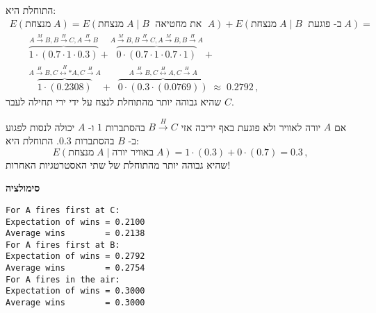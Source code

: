 התוחלת היא:
\vspace*{-4ex}
\[
\renewcommand*{\arraystretch}{2.5}
\begin{array}{l}
E(\textrm{מנצחת}\;A) =E(\textrm{מנצחת}\;A\;|\;B\;\textrm{ את מחטיאה }\;A) + E(\textrm{מנצחת}\;A\;|\;B\;\textrm{ ב- פוגעת}\;A)=\\
\qquad
\overbrace{1\cdot (0.7\cdot 1\cdot 0.3)}%
^{A\stackrel{M}{\longrightarrow}B, B\stackrel{H}{\longrightarrow}C, A\stackrel{H}{\longrightarrow}B}+
\overbrace{0\cdot (0.7\cdot 1\cdot 0.7\cdot 1)}%
^{A\stackrel{M}{\longrightarrow}B, B\stackrel{H}{\longrightarrow}C,A\stackrel{M}{\longrightarrow}B,B\stackrel{H}{\longrightarrow}A} +\\
\qquad
\overbrace{1\cdot (0.2308)}%
^{A\stackrel{H}{\longrightarrow}B, C\stackrel{H}{\longleftrightarrow*}A,C\stackrel{H}{\longrightarrow}A}\!\!\! +\;\;
\overbrace{0\cdot (0.3\cdot (0.0769))}%
^{A\stackrel{H}{\longrightarrow}B, C\stackrel{H}{\longleftrightarrow}A,C\stackrel{H}{\longrightarrow}A}
\;\approx\; 0.2792\,,
\end{array}
\]
שהיא גבוהה יותר מהתוחלת לנצח על ידי ירי תחילה לעבר 
$C$.

אם
$A$
יורה לאוויר ולא פוגעת באף יריבה אזי
$B\stackrel{H}{\longrightarrow}C$
בהסתברות 
$1$
ו-%
$A$
יכולה לנסות לפגוע ב-%
$B$
בהסתברות
$0.3$.
התוחלת היא:
\[
E(\textrm{מנצחת}\;A\;|\;\textrm{באוויר יורה}\;A) = 1\cdot(0.3) + 0\cdot(0.7)=0.3\,,
\]
שהיא גבוהה יותר מהתוחלת של שתי האסטרטגיות האחרות!

\textbf{סימולציה}
\begin{verbatim}
For A fires first at C:
Expectation of wins = 0.2100
Average wins        = 0.2138
For A fires first at B:
Expectation of wins = 0.2792
Average wins        = 0.2754
For A fires in the air:
Expectation of wins = 0.3000
Average wins        = 0.3000
\end{verbatim}

